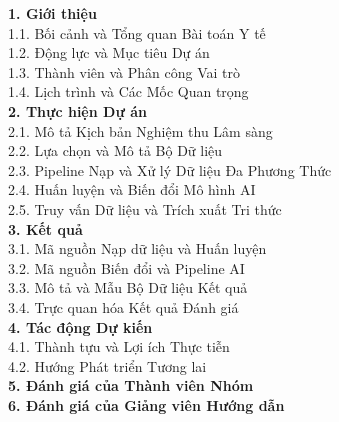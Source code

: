 \documentclass[11pt,a4paper]{article}
\begin{document}
\vspace{1.0cm}

\begin{minipage}{0.9\textwidth}
  {\large\bfseries 1. Giới thiệu}\\[0.15cm]
  \hspace*{0.6cm} 1.1. Bối cảnh và Tổng quan Bài toán Y tế \\
  \hspace*{0.6cm} 1.2. Động lực và Mục tiêu Dự án \\
  \hspace*{0.6cm} 1.3. Thành viên và Phân công Vai trò \\
  \hspace*{0.6cm} 1.4. Lịch trình và Các Mốc Quan trọng \\[0.5cm]

  {\large\bfseries 2. Thực hiện Dự án}\\[0.15cm]
  \hspace*{0.6cm} 2.1. Mô tả Kịch bản Nghiệm thu Lâm sàng \\
  \hspace*{0.6cm} 2.2. Lựa chọn và Mô tả Bộ Dữ liệu \\
  \hspace*{0.6cm} 2.3. Pipeline Nạp và Xử lý Dữ liệu Đa Phương Thức \\
  \hspace*{0.6cm} 2.4. Huấn luyện và Biến đổi Mô hình AI \\
  \hspace*{0.6cm} 2.5. Truy vấn Dữ liệu và Trích xuất Tri thức \\[0.5cm]

  {\large\bfseries 3. Kết quả}\\[0.15cm]
  \hspace*{0.6cm} 3.1. Mã nguồn Nạp dữ liệu và Huấn luyện \\
  \hspace*{0.6cm} 3.2. Mã nguồn Biến đổi và Pipeline AI \\
  \hspace*{0.6cm} 3.3. Mô tả và Mẫu Bộ Dữ liệu Kết quả \\
  \hspace*{0.6cm} 3.4. Trực quan hóa Kết quả Đánh giá \\[0.5cm]

  {\large\bfseries 4. Tác động Dự kiến}\\[0.15cm]
  \hspace*{0.6cm} 4.1. Thành tựu và Lợi ích Thực tiễn \\
  \hspace*{0.6cm} 4.2. Hướng Phát triển Tương lai \\[0.5cm]

  {\large\bfseries 5. Đánh giá của Thành viên Nhóm}\\[0.5cm]

  {\large\bfseries 6. Đánh giá của Giảng viên Hướng dẫn}
\end{minipage}
\end{document}
